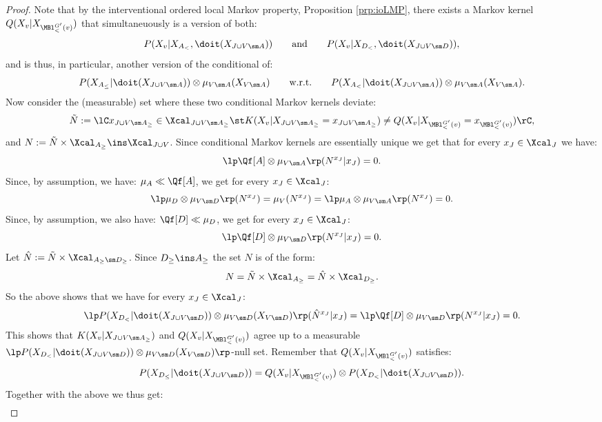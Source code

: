 \begin{Thm}
\begin{proof}
        Note that by the interventional ordered local Markov property, Proposition \ref{prp:ioLMP},
        there exists a Markov kernel $Q(X_v|X_{\MBl^{G'}_<(v)})$ that simultaneuously is a version of both:
        \[ P(X_v|X_{A_<},\doit(X_{J\cup V \sm A})) \qquad \text{and} \qquad P(X_v|X_{D_<},\doit(X_{J\cup V \sm D})), \]
        and is thus, in particular, another version of the conditional of:
        \[  P(X_{A_\le}|\doit(X_{J \cup V \sm A})) \otimes \mu_{V \sm A}(X_{V \sm A})  \qquad \text{w.r.t.} \qquad  P(X_{A_<}|\doit(X_{J \cup V \sm A})) \otimes \mu_{V \sm A}(X_{V \sm A}). \]
        Now consider the (measurable) set where these two conditional Markov kernels deviate:
        \[ \tilde N := \lC x_{J \cup V \sm A_\ge} \in \Xcal_{J \cup V \sm A_\ge}  
            \st K(X_v|X_{J \cup V \sm A_\ge}=x_{J \cup V \sm A_\ge})
        \neq Q(X_v|X_{\MBl^{G'}_<(v)} = x_{\MBl^{G'}_<(v)}) \rC, \]
        and $N := \tilde N \times \Xcal_{A_\ge} \ins \Xcal_{J \cup V}$.
        Since conditional Markov kernels are essentially unique we get that for every $x_J \in \Xcal_J$ we have:
        \[ \lp \Qf[A] \otimes \mu_{V \sm A} \rp (N^{x_J}|x_J) = 0.   \]
        Since, by assumption, we have: $\mu_A \ll \Qf[A]$, we get for every $x_J \in \Xcal_J$:
        \[ \lp \mu_D \otimes \mu_{V \sm D} \rp (N^{x_J}) = \mu_V (N^{x_J}) = \lp \mu_A \otimes \mu_{V \sm A} \rp (N^{x_J}) = 0.  \]
        Since, by assumption, we also have: $\Qf[D] \ll \mu_D$, we get for every $x_J \in \Xcal_J$:
        \[ \lp \Qf[D] \otimes \mu_{V \sm D} \rp (N^{x_J}|x_J) = 0.   \]
        Let $\hat N := \tilde N \times \Xcal_{A_\ge \sm D_\ge}$.
        Since $D_\ge \ins A_\ge$ the set $N$ is of the form:
         \[ N = \tilde N \times \Xcal_{A_\ge} = \hat N \times \Xcal_{D_\ge}. \]
        So the above shows that we have for every $x_J \in \Xcal_J$:
        \[ \lp P(X_{D_<}|\doit(X_{J \cup V \sm D})) \otimes \mu_{V\sm D}(X_{V \sm D}) \rp (\hat N^{x_J}|x_J) = \lp \Qf[D] \otimes \mu_{V \sm D} \rp (N^{x_J}|x_J) = 0.  \]
        This shows that $K(X_v|X_{J \cup V \sm A_\ge})$ and $Q(X_v|X_{\MBl^{G'}_<(v)})$
        agree up to a measurable \\ $\lp P(X_{D_<}|\doit(X_{J \cup V \sm D})) \otimes \mu_{V\sm D}(X_{V \sm D})\rp$-null set.
        Remember that $Q(X_v|X_{\MBl^{G'}_<(v)})$ satisfies:
        \[ P(X_{D_\le}|\doit(X_{J \cup V \sm D})) = Q(X_v|X_{\MBl^{G'}_<(v)}) \otimes P(X_{D_<}|\doit(X_{J \cup V \sm D})).\]
        Together with the above we thus get:
        \begin{align*} 

\end{align*}
\end{proof}
\end{Thm}

